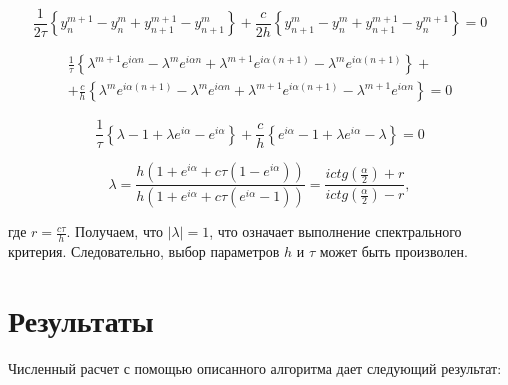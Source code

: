 \documentclass[12pt]{article}
\begin{document}
		\begin{equation}
			\frac{1}{2\tau}\left\{ y^{m+1}_n - y^m_n + y^{m+1}_{n+1} - y^m_{n+1} \right\} + \frac{c}{2h}\left\{ y^m_{n+1} - y^m_n + y^{m+1}_{n+1} - y^{m+1}_n \right\} = 0
		\end{equation}
		
		\begin{multline}
			\frac{1}{\tau}\left\{ \lambda^{m+1}e^{i\alpha n} - \lambda^m e^{i\alpha n} + \lambda^{m+1}e^{i\alpha(n+1)} - \lambda^m e^{i\alpha(n+1)} \right\} +\\
			+ \frac{c}{h}\left\{ \lambda^m e^{i\alpha(n+1)} - \lambda^m e^{i\alpha n} + \lambda^{m+1}e^{i\alpha(n+1)} - \lambda^{m+1}e^{i\alpha n} \right\} = 0
		\end{multline}
		
		\begin{equation}
			\frac{1}{\tau}\left\{ \lambda - 1 + \lambda e^{i\alpha} - e^{i\alpha} \right\} + \frac{c}{h}\left\{ e^{i\alpha} - 1 + \lambda e^{i\alpha} - \lambda \right\} = 0
		\end{equation}
		
		\begin{equation}
			\lambda = \frac{h(1+e^{i\alpha} + c\tau(1-e^{i\alpha}))}{h(1+e^{i\alpha} + c\tau(e^{i\alpha}-1))} = \frac{ictg(\frac{\alpha}{2}) + r}{ictg(\frac{\alpha}{2})-r},
		\end{equation}
		
		где $r = \frac{c\tau}{h}$. Получаем, что $|\lambda| = 1$, что означает выполнение спектрального критерия. Следовательно, выбор параметров $h$ и $\tau$ может быть произволен.
		
		\newpage
		\section{Результаты}
		Численный расчет с помощью описанного алгоритма дает следующий результат:
		
\end{document}
